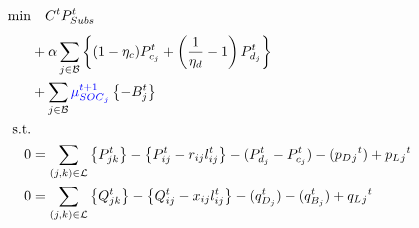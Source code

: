 \begin{gather}
	\begin{align}
		\min_{
		} 
		\vspace{-15ex} %
		& \quad
		C^t P_{Subs}^t \\
		&+ \alpha \sum_{j \in \mathcal{B}} \left\{ (1- \eta_c)P_{c_j}^t + \left(\frac{1}{\eta_d}-1\right) P_{d_j}^t \right\} \nonumber\\
		&+ \sum_{j \in \mathcal{B}} { \textcolor{blue}{ \mu_{SOC{_j}}^{t+1}} \left\{ - B_{j}^{t} \right\} } \nonumber\\
		\text{s.t.} & {}\nonumber\\
		{0} & = {\sum_{(j, k) \in \mathcal{L}} \left\{P_{jk}^t\right\} - \left\{P_{ij}^t - r_{ij}l_{ij}^t\right\} - (P_{d_j}^t - P_{c_j}^t)  - (p_D{_j}^t) + p_L{_j}^t} && \\
		{0} & = {\sum_{(j, k) \in \mathcal{L}} \left\{Q_{jk}^t\right\} - \left\{Q_{ij}^t - x_{ij}l_{ij}^t\right\} - (q_{D_j}^t) - (q_{B_j}^t) + q_L{_j}^t} && \\

\end{align}
\end{gather}
